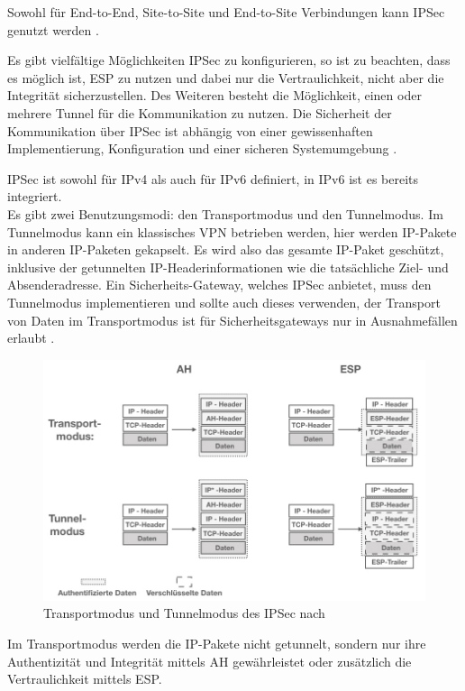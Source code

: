 Sowohl für End-to-End, Site-to-Site und End-to-Site Verbindungen kann IPSec genutzt werden \cite{rfc4301}.

 Es gibt vielfältige Möglichkeiten IPSec zu konfigurieren, so ist zu beachten, dass es möglich ist, ESP zu nutzen und dabei nur die Vertraulichkeit, nicht aber die Integrität sicherzustellen. Des Weiteren besteht die Möglichkeit, einen oder mehrere Tunnel für die Kommunikation zu nutzen. Die Sicherheit der Kommunikation  über IPSec ist abhängig von einer gewissenhaften Implementierung, Konfiguration und einer sicheren Systemumgebung \cite{rfc4301}. 
  
  IPSec ist sowohl für IPv4 als auch für IPv6 definiert, in IPv6 ist es bereits integriert.
\\

Es gibt zwei Benutzungsmodi: den Transportmodus und den Tunnelmodus. Im  Tunnelmodus kann ein klassisches VPN betrieben werden, hier werden IP-Pakete in anderen IP-Paketen gekapselt. Es wird also das gesamte IP-Paket geschützt, inklusive der getunnelten IP-Headerinformationen wie die tatsächliche Ziel- und Absenderadresse. Ein Sicherheits-Gateway, welches IPSec anbietet, muss den Tunnelmodus implementieren und sollte auch dieses verwenden, der Transport von Daten im Transportmodus ist für Sicherheitsgateways nur in Ausnahmefällen erlaubt \cite{rfc4301}. 
\begin{figure}[h]
	\includegraphics[width=\linewidth]{ahsep.001.jpeg}
	\caption{Transportmodus und Tunnelmodus des IPSec nach \cite{lipp2007vpn}}
	\label{ahesp}
\end{figure}
Im Transportmodus werden die IP-Pakete nicht getunnelt, sondern nur ihre Authentizität und Integrität mittels AH ge\-währleistet oder zusätzlich die Vertraulichkeit mittels ESP. 

